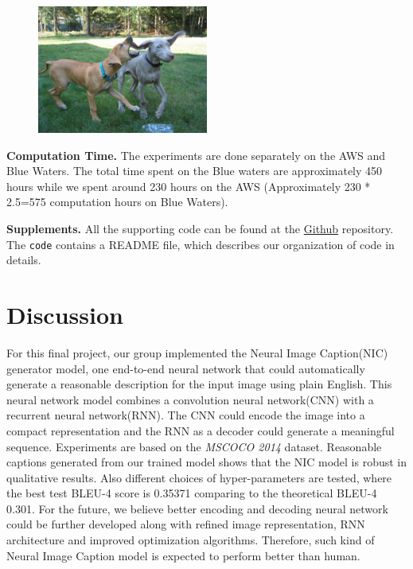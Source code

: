 \documentclass[fleqn,10pt]{SelfArx} %
\begin{document}
\begin{figure}[H]
\centering
\includegraphics[width=0.5\textwidth]{dogs.png}
\end{figure}




\textbf{Computation Time.} The experiments are done separately on the AWS and Blue Waters. The total time spent on the Blue waters are approximately 450 hours while we spent around 230 hours on the AWS (Approximately 230 * 2.5=575 computation hours on Blue Waters).

\textbf{Supplements.} All the supporting code can be found at the \href{https://github.com/Rothdyt/Projects/tree/master/Show-and-tell}{Github} repository. The \verb|code| contains a README file, which describes our organization of code in details.


\section{Discussion}
For this final project, our group implemented the Neural Image Caption(NIC) generator model, one end-to-end neural network that could automatically generate a reasonable description for the input image using plain English. This neural network model combines a convolution neural network(CNN) with a recurrent neural network(RNN). The CNN could encode the image into a compact representation and the RNN as a decoder could generate a  meaningful sequence. Experiments are based on the \textit{MSCOCO 2014} dataset. Reasonable captions generated from our trained model shows that the NIC model is robust in qualitative results. Also different choices of hyper-parameters are tested, where the best test BLEU-4 score is 0.35371 comparing to the theoretical BLEU-4 0.301. For the future, we believe better encoding and decoding neural network could be further developed along with  refined image representation, RNN architecture and improved optimization algorithms. Therefore, such kind of Neural Image Caption model is expected to perform better than human.
\end{document}
